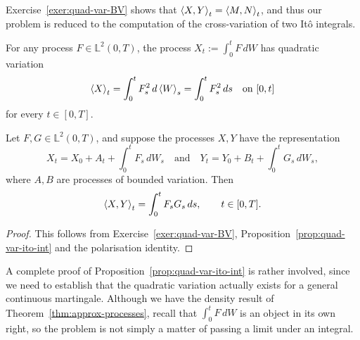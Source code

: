 Exercise~\ref{exer:quad-var-BV} shows that $\braket{X,Y}_t = \braket{M,N}_t$, and thus our problem is reduced to the computation of the cross-variation of two It\^{o} integrals.
\begin{proposition}
\label{prop:quad-var-ito-int}
    For any process $F\in\mathbb{L}^2(0,T)$, the process $X_t:=\int_0^t F\,dW$ has quadratic variation
    \begin{equation}
    \label{eq:quad-var-ito-int}
        \braket{X}_t = \int_0^t F_s^2\,d\braket{W}_s = \int_0^t F_s^2\,ds \quad\text{on } [0,t]
    \end{equation}
    for every $t\in [0,T]$.
\end{proposition}

\begin{corollary}
	\label{cor:quad-var-ito-int}
	Let $F,G\in\mathbb{L}^2(0,T)$, and suppose the processes $X,Y$ have the representation
	\begin{equation*}
		X_t=X_0 + A_t + \int_0^t F_s\,dW_s \quad\text{and}\quad Y_t=Y_0 + B_t + \int_0^t G_s\,dW_s,
	\end{equation*}
	where $A,B$ are processes of bounded variation. Then
	\begin{equation}
		\braket{X,Y}_t = \int_0^t F_s G_s \,ds, \qquad t\in [0,T].
	\end{equation}
\end{corollary}

\begin{proof}
	This follows from Exercise~\ref{exer:quad-var-BV}, Proposition~\ref{prop:quad-var-ito-int} and the polarisation identity.
\end{proof}

A complete proof of Proposition~\ref{prop:quad-var-ito-int} is rather involved, since we need to establish that the quadratic variation actually exists for a general continuous martingale. Although we have the density result of Theorem~\ref{thm:approx-processes}, recall that $\int_0^t F\,dW$ is an object in its own right, so the problem is not simply a matter of passing a limit under an integral.

